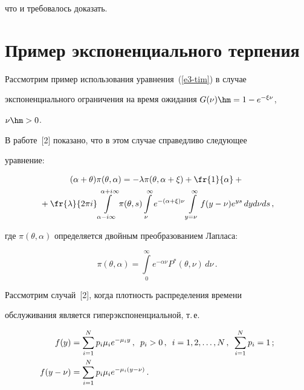 что и требовалось доказать.

    



\section{Пример экспоненциального терпения}



    

    Рассмотрим пример использования уравнения~(\ref{e3-tim}) в случае 

экспоненциального ограничения на время ожидания $G(\nu)\hm=1-e^{-\xi\nu}$, 

$\nu\hm>0$.

    

    В работе~[2] показано, что в этом случае справедливо следующее 

уравнение:

    \begin{multline}

    (\alpha+\theta)\pi(\theta,\alpha) =-\lambda 

\pi(\theta,\alpha+\xi)+\fr{1}{\alpha}+ {}\\

{}+\fr{\lambda}{2\pi i} \int\limits_{\alpha-

i\infty}^{\alpha+i\infty} \pi(\theta,s)  \int\limits_\nu^\infty e^{-(\alpha+\xi)\nu} 

\int\limits_{y=\nu}^\infty f(y-\nu) e^{ys}\,dy d\nu ds\,,

    \label{e6-tim}

    \end{multline}

где $\pi(\theta,\alpha)$ определяется двойным преобразованием Лапласа:

$$

\pi(\theta,\alpha)=\int\limits_0^\infty e^{-\alpha\nu} P^*(\theta,\nu)\,d\nu\,.

$$

    

    Рассмотрим случай~[2], когда плотность распределения времени 

обслуживания является гиперэкспоненциальной, т.\,е. 

    \begin{align*}

    f(y) &= \sum\limits_{i=1}^N p_i \mu_i e^{-\mu_i y}\,,\enskip p_i>0\,,\enskip 

i=1,2,\ldots , N\,,\enskip \sum\limits_{i=1}^N p_i=1\,;\\

    f(y-\nu) &= \sum\limits_{i=1}^N  p_i \mu_i e^{-\mu_i(y-\nu)}\,.

    \end{align*}

